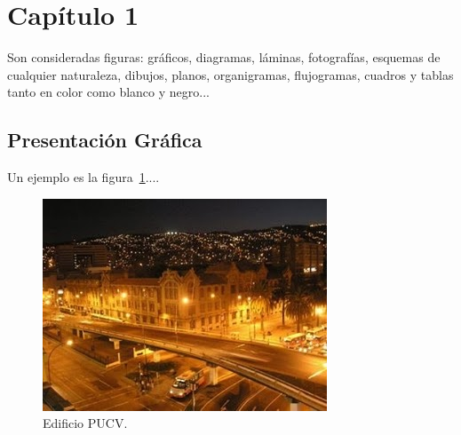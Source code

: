 \section{Capítulo 1}

Son consideradas figuras: gráficos, diagramas, láminas, fotografías,
esquemas de cualquier naturaleza, dibujos, planos, organigramas, flujogramas,
cuadros y tablas tanto en color como blanco y negro...

\subsection{Presentación Gráfica}
       
Un ejemplo es la figura~\ref{fig:pucv}....

\begin{figure}[H]
    \begin{center}
        \includegraphics[width=0.6\linewidth]{Capitulo_1/imagenes/pucv.jpg} 
        \caption{Edificio PUCV.}\label{fig:pucv}
    \end{center}
\end{figure}